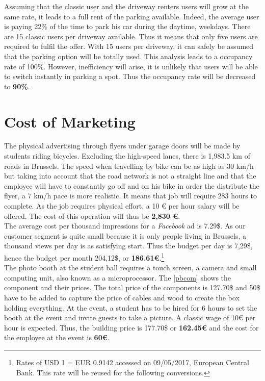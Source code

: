 \documentclass[12pt,a4paper,oneside]{book}
\begin{document}
Assuming that the classic user and the driveway renters users will grow at the same rate, it leads to a full rent of the parking available. Indeed, the average user is paying 22\% of the time to park his car during the daytime, weekdays. There are 15 classic users per driveway available. Thus it means that only five users are required to fulfil the offer. With 15 users per driveway, it can safely be assumed that the parking option will be totally used. This analysis leads to a occupancy rate of 100\%. However, inefficiency will arise, it is unlikely that users will be able to switch instantly in parking a spot. Thus the occupancy rate will be decreased to \textbf{90\%}.

\section{Cost of Marketing}
\label{scom}

The physical advertising through flyers under garage doors will be made by students riding bicycles. Excluding the high-speed lanes, there is 1,983.5 km of roads in Brussels.\cite{mtvr} The speed when travelling by bike can be as high as 30 km/h but taking into account that the road network is not a straight line and that the employee will have to constantly go off and on his bike in order the distribute the flyer, a 7 km/h pace is more realistic. It means that job will require 283 hours to complete. As the job requires physical effort, a 10 \euro{} per hour salary will be offered. The cost of this operation will thus be \textbf{2,830 \euro{}}.\\

The average cost per thousand impressions for a \textit{Facebook} ad is 7.29\$.\cite{fbad} As our customer segment is quite small because it is only people living in Brussels, a thousand views per day is as satisfying start. Thus the budget per day is 7,29\$, hence the budget per month 204,12\$, or \textbf{186.61\euro{}}.\footnote{Rates of USD 1 = EUR 0.9142 accessed on 09/05/2017, European Central Bank. This rate will be reused for the following conversions.}\\

The photo booth at the student ball requires a touch screen, a camera and small computing unit, also known as a microprocessor. The \autoref{pbcom} shows the component and their prices. The total price of the components is 127.70\$ and 50\$ have to be added to capture the price of cables and wood to create the box holding everything. At the event, a student has to be hired for 6 hours to set the booth at the event and invite guests to take a picture. A classic wage of 10\euro{} per hour is expected. Thus, the building price is 177.70\$ or \textbf{162.45\euro{}} and the cost for the employee at the event is \textbf{60\euro{}}.\\
\end{document}

